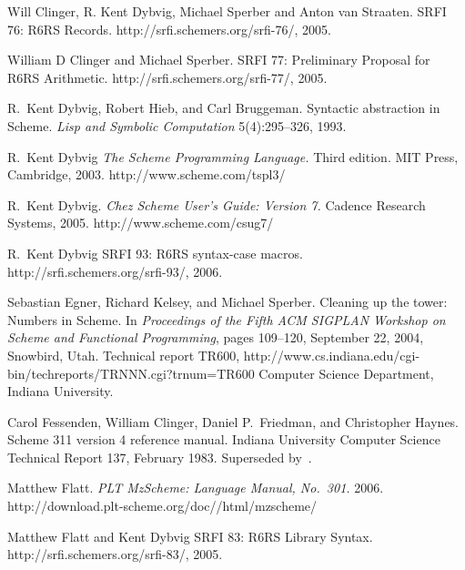 \begin{thebibliography}{999}
Will Clinger, R. Kent Dybvig, Michael Sperber and Anton van Straaten.
SRFI 76: R6RS Records.
{\cf http://srfi.schemers.org/srfi-76/}, 2005.

William D Clinger and Michael Sperber.
SRFI 77: Preliminary Proposal for R6RS Arithmetic.
{\cf http://srfi.schemers.org/srfi-77/}, 2005.

R.~Kent Dybvig, Robert Hieb, and Carl Bruggeman.
Syntactic abstraction in Scheme.
{\em Lisp and Symbolic Computation} 5(4):295--326, 1993.

R.~Kent Dybvig
{\em The Scheme Programming Language.}
Third edition. MIT Press, Cambridge, 2003.
{\cf http://www.scheme.com/tspl3/}

R.~Kent Dybvig.
{\em Chez Scheme User's Guide: Version 7.}
Cadence Research Systems, 2005.
{\cf http://www.scheme.com/csug7/}

R.\ Kent Dybvig
SRFI 93: R6RS {\cf syntax-case} macros.
{\cf http://srfi.schemers.org/srfi-93/}, 2006.

Sebastian Egner, Richard Kelsey, and Michael Sperber.
Cleaning up the tower: Numbers in Scheme.
In {\em Proceedings of the Fifth ACM SIGPLAN
  Workshop on Scheme and Functional Programming},
pages 109--120,
September 22, 2004, Snowbird, Utah.
Technical report TR600,
{\cf http://www.cs.indiana.edu/\linebreak[1]cgi-bin/\linebreak[1]techreports/\linebreak[1]TRNNN.cgi?trnum=TR600}
Computer Science Department, Indiana University.

Carol Fessenden, William Clinger, Daniel P.~Friedman, and Christopher Haynes.
Scheme 311 version 4 reference manual.
Indiana University Computer Science Technical Report 137, February 1983.
Superseded by~\cite{Scheme84}.

Matthew Flatt.
{\em PLT MzScheme: Language Manual, No.~301.}
2006.
{\cf http://download.plt-scheme.org/\linebreak[1]doc//\linebreak[1]html/\linebreak[1]mzscheme/}

Matthew Flatt and Kent Dybvig
SRFI 83: R6RS Library Syntax.
{\cf http://srfi.schemers.org/\linebreak[1]srfi-83/}, 2005.
 

\end{thebibliography}
